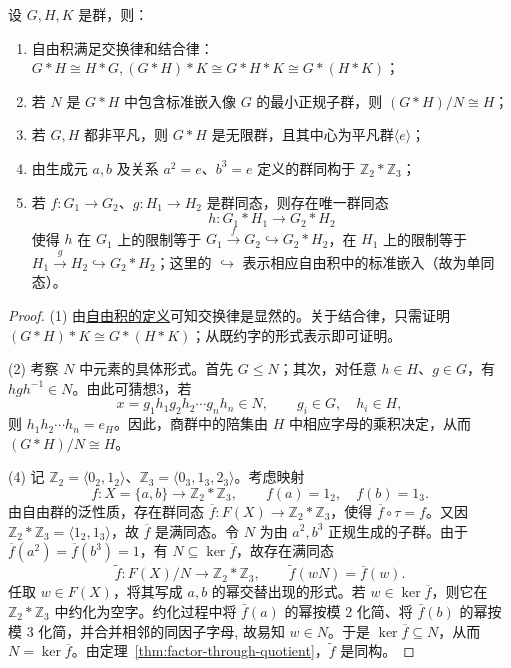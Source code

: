 \begin{proposition}\label{prop:free-product-facts}
设 $G,H,K$ 是群，则：
\begin{enumerate}[label=(\arabic*)]
  \item 自由积满足交换律和结合律：$G*H\cong H*G, (G*H)*K\cong G*H*K\cong G*(H*K)$；
  \item 若 $N$ 是 $G*H$ 中包含标准嵌入像 $G$ 的最小正规子群，则 $(G*H)/N\cong H$；
  \item 若 $G,H$ 都非平凡，则 $G*H$ 是无限群，且其中心为平凡群$\langle e\rangle$；
  \item 由生成元 $a,b$ 及关系 $a^2=e$、$b^3=e$ 定义的群同构于 $\mathbb Z_2*\mathbb Z_3$；
  \item 若 $f:G_1\to G_2$、$g:H_1\to H_2$ 是群同态，则存在唯一群同态
  \[
    h:G_1*H_1\longrightarrow G_2*H_2
  \]
  使得 $h$ 在 $G_1$ 上的限制等于 $G_1\xrightarrow{f}G_2\hookrightarrow G_2*H_2$，在 $H_1$ 上的限制等于 $H_1\xrightarrow{g}H_2\hookrightarrow G_2*H_2$；这里的 $\hookrightarrow$ 表示相应自由积中的标准嵌入（故为单同态）。
\end{enumerate}
\end{proposition}

\begin{proof}
(1) 由\hyperref[def:free-product]{自由积的定义}可知交换律是显然的。关于结合律，只需证明 $(G*H)*K\cong G*(H*K)$；从既约字的形式表示即可证明。

(2) 考察 $N$ 中元素的具体形式。首先 $G\leq N$；其次，对任意 $h\in H$、$g\in G$，有 $hgh^{-1}\in N$。由此可猜想3，若
\[
  x=g_1h_1g_2h_2\cdots g_nh_n\in N,\qquad g_i\in G,\quad h_i\in H,
\]
则 $h_1h_2\cdots h_n=e_H$。因此，商群中的陪集由 $H$ 中相应字母的乘积决定，从而 $(G*H)/N\cong H$。

(4) 记 $\mathbb Z_2=\langle 0_2, 1_2\rangle$、$\mathbb Z_3=\langle 0_3, 1_3, 2_3\rangle$。考虑映射
\[
  f:X=\{a,b\}\longrightarrow\mathbb Z_2*\mathbb Z_3,\qquad f(a)=1_2,\quad f(b)=1_3.
\]
由自由群的泛性质，存在群同态 $\overline f:F(X)\to\mathbb Z_2*\mathbb Z_3$，使得 $\overline f\circ\tau=f$。又因 $\mathbb Z_2*\mathbb Z_3=\langle 1_2,1_3\rangle$，故 $\overline f$ 是满同态。令 $N$ 为由 $a^2,b^3$ 正规生成的子群。由于 $\overline f(a^2)=\overline f(b^3)=1$，有 $N\subseteq\ker\overline f$，故存在满同态
\[
  \widetilde f:F(X)/N\longrightarrow\mathbb Z_2*\mathbb Z_3,\qquad \widetilde f(wN)=\overline f(w).
\]
任取 $w\in F(X)$，将其写成 $a,b$ 的幂交替出现的形式。若 $w\in\ker\overline f$，则它在 $\mathbb Z_2*\mathbb Z_3$ 中约化为空字。约化过程中将 $\bar{f}(a)$ 的幂按模 $2$ 化简、将 $\bar{f}(b)$ 的幂按模 $3$ 化简，并合并相邻的同因子字母, 故易知 $w\in N$。于是 $\ker\overline f\subseteq N$，从而 $N=\ker\overline f$。由定理~\ref{thm:factor-through-quotient}，$\widetilde f$ 是同构。
\end{proof}
